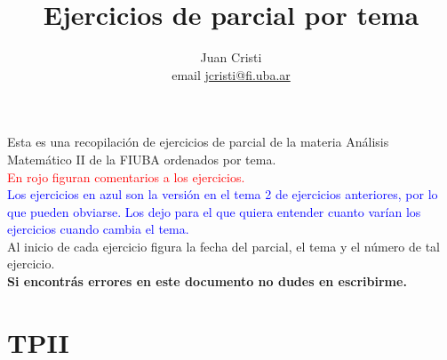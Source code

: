 \documentclass[12pt,a4paper]{article}
\author{Juan Cristi \\ email \href{mailto:jcristi@fi.uba.ar}{jcristi@fi.uba.ar}} %
\title{Ejercicios de parcial por tema}
\renewcommand{\b}[1]{\textbf{#1}}
\newcommand{\red}[1]{\textcolor{red}{#1}}
\newcommand{\blue}[1]{\textcolor{blue}{#1}}
\begin{document}
\maketitle
Esta es una recopilación de ejercicios de parcial de la materia Análisis Matemático II de la FIUBA ordenados por tema. \\

\red{En rojo figuran comentarios a los ejercicios.}\\

\blue{Los ejercicios en azul son la versión en el tema 2 de ejercicios anteriores, por lo que pueden obviarse. Los dejo para el que quiera entender cuanto varían los ejercicios cuando cambia el tema.}\\

Al inicio de cada ejercicio figura la fecha del parcial, el tema y el número de tal ejercicio.\\

\b{Si encontrás errores en este documento no dudes en escribirme.}


\section{TPII}
\end{document}
